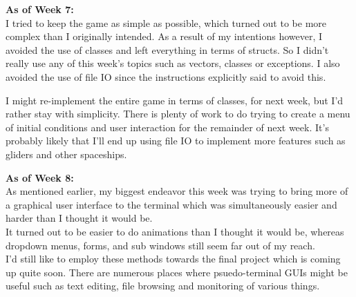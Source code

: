 \documentclass[11pt, oneside]{memoir}
\begin{document}
\textbf{As of Week 7:}\\
I tried to keep the game as simple as possible, which turned out to be
more complex than I originally intended.   As a result of my
intentions however, I avoided the use of classes and left everything
in terms of structs.  So I didn't really use any of this week's topics
such as vectors, classes or exceptions.  I also avoided the use of
file IO since the instructions explicitly said to avoid this. 

I might re-implement the entire game in terms of classes, for next
week, but I'd rather stay with simplicity.  There is plenty of work to
do trying to create a menu of initial conditions and user interaction
for the remainder of next week.  It's probably likely that I'll end up
using file IO to implement more features such as gliders and other
spaceships.  

\textbf{As of Week 8:}\\

As mentioned earlier, my biggest endeavor this week was trying to
bring more of a graphical user interface to the terminal which was
simultaneously easier and harder than I thought it would be.  \\

It turned out to be easier to do animations than I thought it would
be, whereas dropdown menus, forms, and sub windows still seem far out
of my reach.  \\

I'd still like to employ these methods towards the final project which
is coming up quite soon.  There are numerous places where
psuedo-terminal GUIs might be useful such as text editing, file
browsing and monitoring of various things. 
\end{document}
